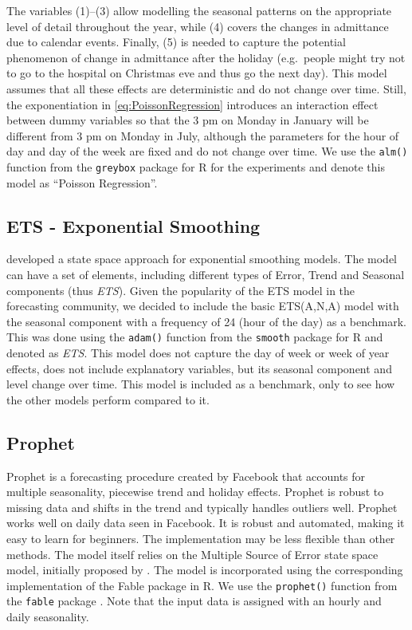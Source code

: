 \documentclass[]{elsarticle} %
\begin{document}
The variables (1)--(3) allow modelling the seasonal patterns on the appropriate level of detail throughout the year, while (4) covers the changes in admittance due to calendar events. Finally, (5) is needed to capture the potential phenomenon of change in admittance after the holiday (e.g.~people might try not to go to the hospital on Christmas eve and thus go the next day). This model assumes that all these effects are deterministic and do not change over time. Still, the exponentiation in \eqref{eq:PoissonRegression} introduces an interaction effect between dummy variables so that the 3 pm on Monday in January will be different from 3 pm on Monday in July, although the parameters for the hour of day and day of the week are fixed and do not change over time. We use the \texttt{alm()} function from the \texttt{greybox} package \citep{Svetunkov2021Greybox} for R \citep{RTeam2021} for the experiments and denote this model as ``Poisson Regression''.

\hypertarget{ets---exponential-smoothing}{%
\subsection{ETS - Exponential Smoothing}\label{ets---exponential-smoothing}}

\citet{Hyndman2008b} developed a state space approach for exponential smoothing models. The model can have a set of elements, including different types of Error, Trend and Seasonal components (thus \emph{ETS}). Given the popularity of the ETS model in the forecasting community, we decided to include the basic ETS(A,N,A) model with the seasonal component with a frequency of 24 (hour of the day) as a benchmark. This was done using the \texttt{adam()} function from the \texttt{smooth} package \citep{Svetunkov2021Smooth} for R and denoted as \emph{ETS}. This model does not capture the day of week or week of year effects, does not include explanatory variables, but its seasonal component and level change over time. This model is included as a benchmark, only to see how the other models perform compared to it.

\hypertarget{prophet}{%
\subsection{Prophet}\label{prophet}}

Prophet is a forecasting procedure created by Facebook \citep{taylor2018forecasting} that accounts for multiple seasonality, piecewise trend and holiday effects. Prophet is robust to missing data and shifts in the trend and typically handles outliers well. Prophet works well on daily data seen in Facebook. It is robust and automated, making it easy to learn for beginners. The implementation may be less flexible than other methods. The model itself relies on the Multiple Source of Error state space model, initially proposed by \citet{Kalman1960}. The model is incorporated using the corresponding implementation of the Fable package in R. We use the \texttt{prophet()} function from the \texttt{fable} package \citep{fable2020}. Note that the input data is assigned with an hourly and daily seasonality.
\end{document}
